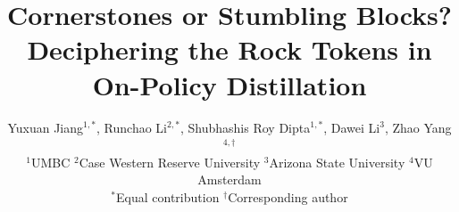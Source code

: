 \documentclass{article}
\title{Cornerstones or Stumbling Blocks? Deciphering the Rock Tokens in On-Policy Distillation}
\author{
Yuxuan Jiang$^{1,*}$,
Runchao Li$^{2,*}$,
Shubhashis Roy Dipta$^{1,*}$,
Dawei Li$^{3}$,
Zhao Yang$^{4,\dagger}$\\
$^{1}$UMBC \quad
$^{2}$Case Western Reserve University \quad
$^{3}$Arizona State University \quad
$^{4}$VU Amsterdam\\
$^{*}$Equal contribution \quad
$^{\dagger}$Corresponding author
}
\begin{document}
\maketitle


\begin{abstract}




\end{abstract}
\end{document}
